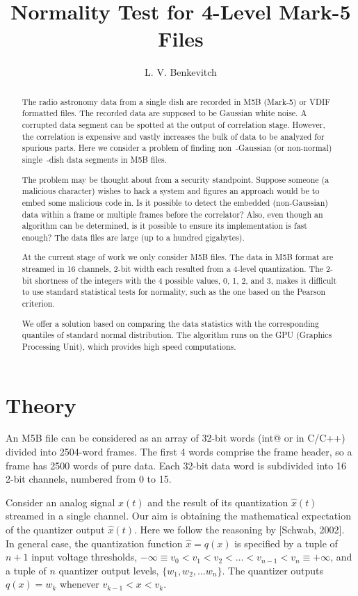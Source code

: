 \documentclass[letterpaper,twoside,12pt]{article}
\title{Normality Test for 4-Level Mark-5 Files}
\author[1]{L. V. Benkevitch}
\affil[1]{\small MIT Haystack observatory, Westford, MA 01886, USA.}
\begin{document}
\maketitle

\begin{abstract}
The radio astronomy data from a single dish are recorded in M5B (Mark-5) or VDIF formatted files. The recorded data are supposed to be Gaussian white noise. A corrupted data segment can be spotted at the output of correlation stage. However, the correlation is expensive and vastly increases the bulk of data to be analyzed for spurious parts. Here we consider a problem of finding non~-Gaussian (or non-normal) single~-dish data segments in M5B files.

The problem may be thought about from a security standpoint. Suppose someone (a malicious character) wishes to hack a system and figures an approach would be to embed some malicious code in. Is it possible to detect the embedded (non-Gaussian) data within a frame or multiple frames before the correlator? Also, even though an algorithm can be determined, is it possible to ensure its implementation is fast enough? The data files are large (up to a hundred gigabytes).

At the current stage of work we only consider M5B files. The data in M5B format are streamed in 16 channels, 2-bit width each resulted from a 4-level quantization. The 2-bit shortness of the integers with the 4 possible values, 0, 1, 2, and 3, makes it difficult to use standard statistical tests for normality, such as the one based on the Pearson criterion.     
 
We offer a solution based on comparing the data statistics with the corresponding quantiles of standard normal distribution. The algorithm runs on the GPU (Graphics Processing Unit), which provides high speed computations.
\end{abstract}


\section{Theory}

An M5B file can be considered as an array of 32-bit words (\verb@unsigned int@ or  \verb@uint@ in C/C++) divided into 2504-word frames. The first 4 words comprise the frame header, so a frame has 2500 words of pure data. Each 32-bit data word is subdivided into 16 2-bit channels, numbered from 0 to 15. 

Consider an analog signal $x(t)$ and the result of its quantization $\hat{x}(t)$ streamed in a single channel. Our aim is obtaining the mathematical expectation of the quantizer output $\hat{x}(t)$. Here we follow the reasoning by [Schwab, 2002]. In general case, the quantization function $\hat{x} = q(x)$ is specified by a tuple of $n+1$ input voltage thresholds, 
$-\infty \equiv v_0 < v_1 < v_2 < \ldots  < v_{n-1} < v_n \equiv +\infty$, and a tuple of $n$ quantizer output levels, $\{ w_1, w_2, \ldots w_n \}$. The quantizer outputs $q(x) = w_k$ whenever $v_{k-1} < x < v_k$.
\end{document}

